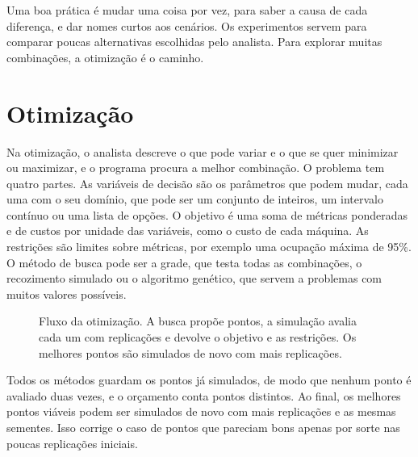 Uma boa prática é mudar uma coisa por vez, para saber a causa de cada diferença, e dar nomes curtos aos cenários. Os experimentos servem para comparar poucas alternativas escolhidas pelo analista. Para explorar muitas combinações, a otimização é o caminho.

\section{Otimização}

Na otimização, o analista descreve o que pode variar e o que se quer minimizar ou maximizar, e o programa procura a melhor combinação. O problema tem quatro partes. As variáveis de decisão são os parâmetros que podem mudar, cada uma com o seu domínio, que pode ser um conjunto de inteiros, um intervalo contínuo ou uma lista de opções. O objetivo é uma soma de métricas ponderadas e de custos por unidade das variáveis, como o custo de cada máquina. As restrições são limites sobre métricas, por exemplo uma ocupação máxima de 95\%. O método de busca pode ser a grade, que testa todas as combinações, o recozimento simulado ou o algoritmo genético, que servem a problemas com muitos valores possíveis.

\begin{figure}[ht]
\centering
{}
\caption{Fluxo da otimização. A busca propõe pontos, a simulação avalia cada um com replicações e devolve o objetivo e as restrições. Os melhores pontos são simulados de novo com mais replicações.}
\label{fig-otimizacao}
\end{figure}

Todos os métodos guardam os pontos já simulados, de modo que nenhum ponto é avaliado duas vezes, e o orçamento conta pontos distintos. Ao final, os melhores pontos viáveis podem ser simulados de novo com mais replicações e as mesmas sementes. Isso corrige o caso de pontos que pareciam bons apenas por sorte nas poucas replicações iniciais.

